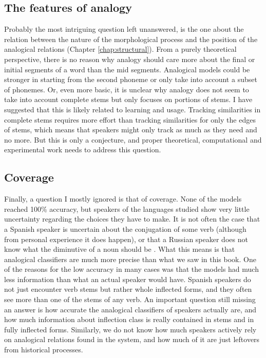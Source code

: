 \subsection{The features of analogy}

Probably the most intriguing question left unanswered, is the one about the relation between the nature of the morphological process and the position of the analogical relations (Chapter \ref{chap:structural}).
From a purely theoretical perspective, there is no reason why analogy should care more about the final or initial segments of a word than the mid segments.
Analogical models could be stronger in starting from the second phoneme or only take into account a subset of phonemes.
Or, even more basic, it is unclear why analogy does not seem to take into account complete stems but only focuses on portions of stems.
I have suggested that this is likely related to learning and usage.
Tracking similarities in complete stems requires more effort than tracking similarities for only the edges of stems, which means that speakers might only track as much as they need and no more.
But this is only a conjecture, and proper theoretical, computational and experimental work needs to address this question.

\subsection{Coverage}

Finally, a question I mostly ignored is that of coverage.
None of the models reached 100\% accuracy, but speakers of the languages studied show very little uncertainty regarding the choices they have to make.
It is not often the case that a Spanish speaker is uncertain about the conjugation of some verb (although from personal experience it does happen), or that a Russian speaker does not know what the diminutive of a noun should be \autocite{Gouskova.2015}.
What this means is that analogical classifiers are much more precise than what we saw in this book.
One of the reasons for the low accuracy in many cases was that the models had much less information than what an actual speaker would have.
Spanish speakers do not just encounter verb stems but rather whole inflected forms, and they often see more than one of the stems of any verb.
An important question still missing an answer is how accurate the analogical classifiers of speakers actually are, and how much information about inflection class is really contained in stems and in fully inflected forms.
Similarly, we do not know how much speakers actively rely on analogical relations found in the system, and how much of it are just leftovers from historical processes.

